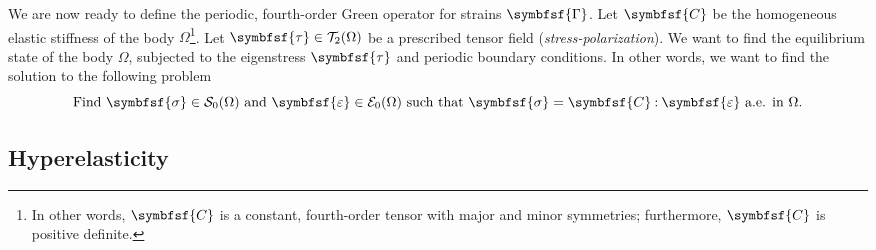 \documentclass[draft, appendixprefix=true, chapterprefix=true, fontsize=12pt, numbers=noendperiod]{scrbook}
\newcommand{\dbldot}{\mathbin{\mathord{:}}}
\newcommand{\tens}[1]{\symbfsf{#1}}
\newcommand{\tensors}{\mathcal T}
\newcommand{\stresses}{\mathcal S}
\newcommand{\strains}{\mathcal E}
\begin{document}
We are now ready to define the periodic, fourth-order Green operator for
strains \(\tens\Gamma\). Let \(\tens C\) be the homogeneous elastic stiffness
of the body \(\Omega\)\footnote{In other words, \(\tens C\) is a constant,
  fourth-order tensor with major and minor symmetries; furthermore, \(\tens C\)
  is positive definite.}. Let \(\tens\tau\in\tensors_2(\Omega)\) be a
prescribed tensor field (\emph{stress-polarization}). We want to find the
equilibrium state of the body \(\Omega\), subjected to the eigenstress
\(\tens\tau\) and periodic boundary conditions. In other words, we want to find
the solution to the following problem
\begin{equation}
  \label{eq:6}
  \text{Find }\tens\sigma\in\stresses_0(\Omega)
  \text{ and }\tens\varepsilon\in\strains_0(\Omega)
  \text{ such that }\tens\sigma=\tens C\dbldot\tens\varepsilon
  \text{ a.e. in }\Omega.
\end{equation}

\subsection{Hyperelasticity}
\end{document}
